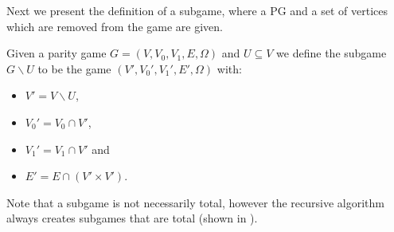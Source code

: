 Next we present the definition of a subgame, where a PG and a set of vertices which are removed from the game are given.

\begin{definition}\cite{ZIELONKA1998135}
	\label{def_org_subgame}
	Given a parity game $G = (V,V_0,V_1, E,\Omega)$ and $U \subseteq V$ we define the subgame $G \backslash U$ to be the game $(V', V_0', V_1', E', \Omega)$ with:
	\begin{itemize}
		\item $V' = V \backslash U$,
		\item $V_0' = V_0 \cap V'$,
		\item $V_1' = V_1 \cap V'$ and
		\item $E' = E \cap (V' \times V')$.
	\end{itemize}
\end{definition}

Note that a subgame is not necessarily total, however the recursive algorithm always creates subgames that are total (shown in \cite{ZIELONKA1998135}).

